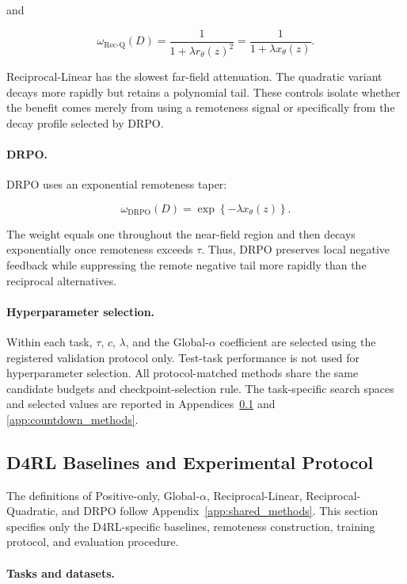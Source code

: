 \documentclass{article}
\theoremstyle{plain}
\theoremstyle{definition}
\theoremstyle{remark}
\begin{document}
and

\[
\omega_{\mathrm{Rec\text{-}Q}}(D)
=
\frac{1}{1+\lambda r_\theta(z)^2}
=
\frac{1}{1+\lambda x_\theta(z)}.
\]

Reciprocal-Linear has the slowest far-field attenuation. The quadratic
variant decays more rapidly but retains a polynomial tail. These
controls isolate whether the benefit comes merely from using a
remoteness signal or specifically from the decay profile selected by
DRPO.

\paragraph{DRPO.}

DRPO uses an exponential remoteness taper:

\[
\omega_{\mathrm{DRPO}}(D)
=
\exp\left\{
-\lambda x_\theta(z)
\right\}.
\]

The weight equals one throughout the near-field region and then decays
exponentially once remoteness exceeds \(\tau\). Thus, DRPO preserves
local negative feedback while suppressing the remote negative tail more
rapidly than the reciprocal alternatives.

\paragraph{Hyperparameter selection.}

Within each task, \(\tau\), \(c\), \(\lambda\), and the
Global-\(\alpha\) coefficient are selected using the registered
validation protocol only. Test-task performance is not used for
hyperparameter selection. All protocol-matched methods share the same
candidate budgets and checkpoint-selection rule. The task-specific
search spaces and selected values are reported in
Appendices~\ref{app:d4rl_methods} and
\ref{app:countdown_methods}.


\subsection{D4RL Baselines and Experimental Protocol}
\label{app:d4rl_methods}

The definitions of Positive-only, Global-\(\alpha\),
Reciprocal-Linear, Reciprocal-Quadratic, and DRPO follow
Appendix~\ref{app:shared_methods}. This section specifies only the
D4RL-specific baselines, remoteness construction, training protocol,
and evaluation procedure.

\paragraph{Tasks and datasets.}
\end{document}
